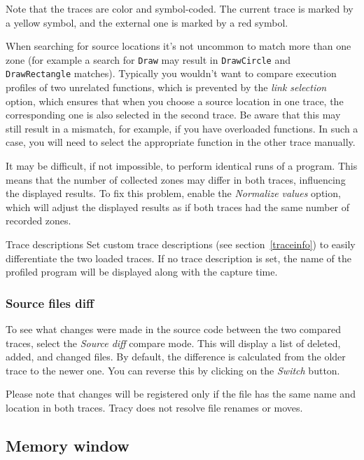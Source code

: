 \documentclass[hidelinks,titlepage,a4paper]{article}
\begin{document}
Note that the traces are color and symbol-coded. The current trace is marked by a yellow \faLemon{} symbol, and the external one is marked by a red \faGem{} symbol.

When searching for source locations it's not uncommon to match more than one zone (for example a search for \texttt{Draw} may result in \texttt{DrawCircle} and \texttt{DrawRectangle} matches). Typically you wouldn't want to compare execution profiles of two unrelated functions, which is prevented by the \emph{link selection} option, which ensures that when you choose a source location in one trace, the corresponding one is also selected in the second trace. Be aware that this may still result in a mismatch, for example, if you have overloaded functions. In such a case, you will need to select the appropriate function in the other trace manually.

It may be difficult, if not impossible, to perform identical runs of a program. This means that the number of collected zones may differ in both traces, influencing the displayed results. To fix this problem, enable the \emph{Normalize values} option, which will adjust the displayed results as if both traces had the same number of recorded zones.

\begin{bclogo}[
noborder=true,
couleur=black!5,
logo=\bclampe
]{Trace descriptions}
Set custom trace descriptions (see section~\ref{traceinfo}) to easily differentiate the two loaded traces. If no trace description is set, the name of the profiled program will be displayed along with the capture time.
\end{bclogo}

\subsubsection{Source files diff}

To see what changes were made in the source code between the two compared traces, select the \emph{Source diff} compare mode. This will display a list of deleted, added, and changed files. By default, the difference is calculated from the older trace to the newer one. You can reverse this by clicking on the \emph{Switch} button.

Please note that changes will be registered only if the file has the same name and location in both traces. Tracy does not resolve file renames or moves.

\subsection{Memory window}
\label{memorywindow}
\end{document}

